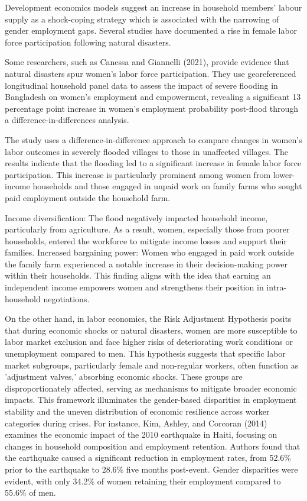 \documentclass[12pt,halfline,a4paper]{ouparticle}
\begin{document}
Development economics models suggest an increase in household members’ labour supply as a shock-coping strategy which is associated with the narrowing of gender employment gaps. Several studies have documented a rise in female labor force participation following natural disasters. 


Some researchers, such as Canessa and Giannelli (2021), provide evidence that natural disasters spur women's labor force participation. They use georeferenced longitudinal household panel data to assess the impact of severe flooding in Bangladesh on women’s employment and empowerment, revealing a significant 13 percentage point increase in women's employment probability post-flood through a difference-in-differences analysis.


The study uses a difference-in-difference approach to compare changes in women’s labor outcomes in severely flooded villages to those in unaffected villages. The results indicate that the flooding led to a significant increase in female labor force participation. This increase is particularly prominent among women from lower-income households and those engaged in unpaid work on family farms who sought paid employment outside the household farm.


Income diversification: The flood negatively impacted household income, particularly from agriculture. As a result, women, especially those from poorer households, entered the workforce to mitigate income losses and support their families.
Increased bargaining power: Women who engaged in paid work outside the family farm experienced a notable increase in their decision-making power within their households. This finding aligns with the idea that earning an independent income empowers women and strengthens their position in intra-household negotiations.


On the other hand, in labor economics, the Risk Adjustment Hypothesis posits that during economic shocks or natural disasters, women are more susceptible to labor market exclusion and face higher risks of deteriorating work conditions or unemployment compared to men. This hypothesis suggests that specific labor market subgroups, particularly female and non-regular workers, often function as 'adjustment valves,' absorbing economic shocks. These groups are disproportionately affected, serving as mechanisms to mitigate broader economic impacts. This framework illuminates the gender-based disparities in employment stability and the uneven distribution of economic resilience across worker categories during crises. For instance, Kim, Ashley, and Corcoran (2014) examines the economic impact of the 2010 earthquake in Haiti, focusing on changes in household composition and employment retention. Authors found that the earthquake caused a significant reduction in employment rates, from 52.6\% prior to the earthquake to 28.6\% five months post-event. Gender disparities were evident, with only 34.2\% of women retaining their employment compared to 55.6\% of men. 
\end{document}
